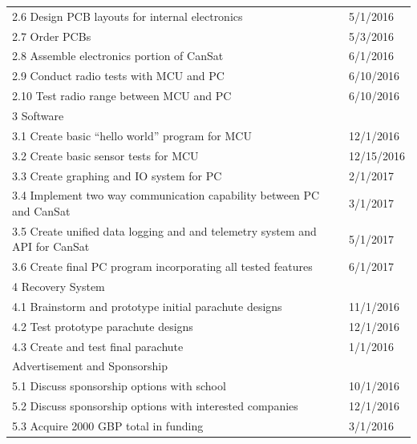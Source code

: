 \documentclass[]{report}
\begin{document}
\begin{center}
\begin{longtable}{ll}
		2.6 Design PCB layouts for internal electronics                             & 5/1/2016   \\
		2.7 Order PCBs                                                              & 5/3/2016   \\
		2.8 Assemble electronics portion of CanSat                                  & 6/1/2016   \\
		2.9 Conduct radio tests with MCU and PC                                     & 6/10/2016  \\
		2.10 Test radio range between MCU and PC                                    & 6/10/2016  \\ \hline
		3 Software                                                                  &            \\ \hline
		3.1 Create basic “hello world” program for MCU                              & 12/1/2016  \\
		3.2 Create basic sensor tests for MCU                                       & 12/15/2016 \\
		3.3 Create graphing and IO system for PC                                    & 2/1/2017   \\
		3.4 Implement two way communication capability between PC and CanSat        & 3/1/2017   \\
		3.5 Create unified data logging and and telemetry system and API for CanSat & 5/1/2017   \\
		3.6 Create final PC program incorporating all tested features               & 6/1/2017   \\ \hline
		4 Recovery System                                                                 &            \\ \hline
		4.1 Brainstorm and prototype initial parachute designs                      & 11/1/2016  \\
		4.2 Test prototype parachute designs                                        & 12/1/2016  \\
		4.3 Create and test final parachute                                         & 1/1/2016   \\ \hline
		Advertisement and Sponsorship                                               &            \\ \hline
		5.1 Discuss sponsorship options with school                                 & 10/1/2016  \\
		5.2 Discuss sponsorship options with interested companies                   & 12/1/2016  \\
		5.3 Acquire 2000 GBP total in funding                                       & 3/1/2016   \\

\end{longtable}
\end{center}
\end{document}
